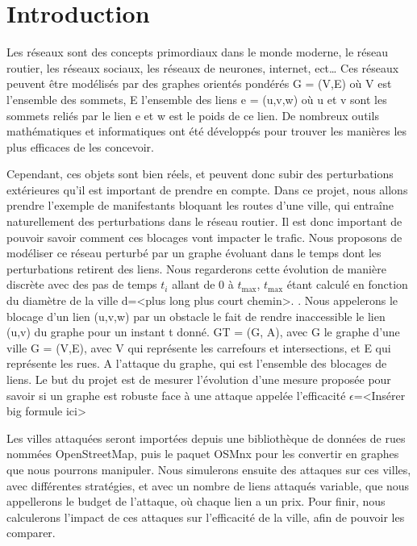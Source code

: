 \section{Introduction}
Les réseaux sont des concepts primordiaux dans le monde moderne, le réseau routier, les réseaux sociaux, les réseaux de neurones, internet, ect\dots
Ces réseaux peuvent être modélisés par des graphes orientés pondérés G = (V,E) où V est l'ensemble des sommets, E l'ensemble des liens e = (u,v,w) où u et v sont les sommets reliés par le lien e et w est le poids de ce lien.
De nombreux outils mathématiques et informatiques ont été développés pour trouver les manières les plus efficaces de les concevoir.

Cependant, ces objets sont bien réels, et peuvent donc subir des perturbations extérieures qu'il est important de prendre en compte.
Dans ce projet, nous allons prendre l'exemple de manifestants bloquant les routes d'une ville, qui entraîne naturellement des perturbations dans le réseau routier.
Il est donc important de pouvoir savoir comment ces blocages vont impacter le trafic.
Nous proposons de modéliser ce réseau perturbé par un graphe évoluant dans le temps dont les perturbations retirent des liens. 
Nous regarderons cette évolution de manière discrète avec des pas de temps ${t_{i}}$ allant de 0 à ${t_{\max}}$, ${t_{\max}}$ étant calculé en fonction du diamètre de la ville d=<plus long plus court chemin>.
.
Nous appelerons le blocage d'un lien (u,v,w) par un obstacle le fait de rendre inaccessible le lien (u,v) du graphe pour un instant t donné.
GT = (G, A), avec
G le graphe d'une ville G = (V,E), avec V qui représente les carrefours et intersections, et E qui représente les rues.
A l'attaque du graphe, qui est l'ensemble des blocages de liens.\label{sec:explication_attaques}
Le but du projet est de mesurer l'évolution d'une mesure proposée pour savoir si un graphe est robuste face à une attaque appelée l'efficacité ${\epsilon}$=<Insérer big formule ici>

Les villes attaquées seront importées depuis une bibliothèque de données de rues nommées OpenStreetMap, puis le paquet OSMnx pour les convertir en graphes que nous pourrons manipuler.
Nous simulerons ensuite des attaques sur ces villes, avec différentes stratégies, et avec un nombre de liens attaqués variable, que nous appellerons le budget de l'attaque, où chaque lien a un prix.
Pour finir, nous calculerons l'impact de ces attaques sur l'efficacité de la ville, afin de pouvoir les comparer.